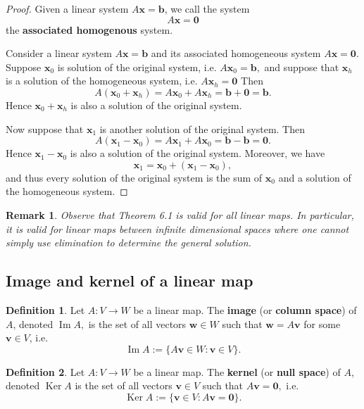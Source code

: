 \documentclass[12pt, a4paper]{article}
\newtheorem*{remark}{Remark}
\theoremstyle{definition}
\newtheorem{definition}{Definition}[section]
\theoremstyle{plain}
\newcommand{\vect}[1]{\mathbf{#1}}
\DeclareMathOperator{\im}{Im}
\DeclareMathOperator{\Ker}{Ker}
\begin{document}
\begin{proof}
Given a linear system $A\vect{x} = \vect{b}$, we call the system $$A\vect{x} = \vect{0}$$ the \textbf{associated homogenous} system.

Consider a linear system $A\vect{x} = \vect{b}$ and its associated homogeneous system $A\vect{x} = \vect{0}$. Suppose $\vect{x}_0$ is solution of the original system, i.e. $A\vect{x}_0 = \vect{b},$ and suppose that $\vect{x}_h$ is a solution of the homogeneous system, i.e. $A\vect{x}_h = \vect{0}$ Then $$A(\vect{x}_0+\vect{x}_h) = A\vect{x}_0+A\vect{x}_h = \vect{b+0=b}.$$ Hence $\vect{x}_0+\vect{x}_h$ is also a solution of the original system. 

Now suppose that $\vect{x}_1$ is another solution of the original system. Then $$A(\vect{x}_1-\vect{x}_0) = A\vect{x}_1+A\vect{x}_0 = \vect{b-b=0}.$$ Hence $\vect{x}_1-\vect{x}_0$ is also a solution of the original system. Moreover, we have $$\vect{x}_1=\vect{x}_0+(\vect{x}_1-\vect{x}_0),$$ and thus every solution of the original system is the sum of $\vect{x}_0$ and a solution of the homogeneous system.
\end{proof}

\begin{remark}
Observe that Theorem 6.1 is valid for all linear maps. In particular, it is valid for linear maps between infinite dimensional spaces where one cannot simply use elimination to determine the general solution.
\end{remark}

\subsection{Image and kernel of a linear map}

\begin{definition} Let $A : V \rightarrow W$ be a linear map. The \textbf{image} (or \textbf{column space}) of $A$, denoted $\im{A},$ is the set of all vectors $\vect{w}\in W$ such that $\vect{w}=A\vect{v}$ for some $\vect{v} \in V$, i.e. $$\im{A} := \{A\vect{v} \in W : \vect{v} \in V\}.$$ \end{definition}

\begin{definition} Let $A : V \rightarrow W$ be a linear map. The \textbf{kernel} (or \textbf{null space}) of $A$, denoted $\Ker{A}$ is the set of all vectors $\vect{v} \in V$ such that $A\vect{v}=\vect{0},$ i.e. $$\Ker{A}:=\{\vect{v} \in V : A\vect{v}=\vect{0}\}.$$  \end{definition}
\end{document}
